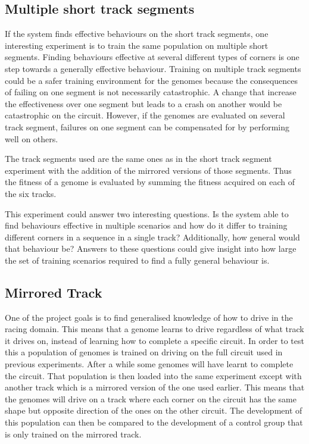 \subsection{Multiple short track segments}

If the system finds effective behaviours on the short track segments, one interesting experiment is to train the same population on multiple short segments. Finding behaviours effective at several different types of corners is one step towards a generally effective behaviour. Training on multiple track segments could be a safer training environment for the genomes because the consequences of failing on one segment is not necessarily catastrophic. A change that increase the effectiveness over one segment but leads to a crash on another would be catastrophic on the circuit. However, if the genomes are evaluated on several track segment, failures on one segment can be compensated for by performing well on others. 

The track segments used are the same ones as in the short track segment experiment with the addition of the mirrored versions of those segments. Thus the fitness of a genome is evaluated by summing the fitness acquired on each of the six tracks.

This experiment could answer two interesting questions. Is the system able to find behaviours effective in multiple scenarios and how do it differ to training different corners in a sequence in a single track? Additionally, how general would that behaviour be? Answers to these questions could give insight into how large the set of training scenarios required to find a fully general behaviour is. 


\subsection{Mirrored Track}
\label{method:mirror}
One of the project goals is to find generalised knowledge of how to drive in the racing domain. This means that a genome learns to drive regardless of what track it drives on, instead of learning how to complete a specific circuit. In order to test this a population of genomes is trained on driving on the full circuit used in previous experiments. After a while some genomes will have learnt to complete the circuit. That population is then loaded into the same experiment except with another track which is a mirrored version of the one used earlier. This means that the genomes will drive on a track where each corner on the circuit has the same shape but opposite direction of the ones on the other circuit. The development of this population can then be compared to the development of a control group that is only trained on the mirrored track. 

